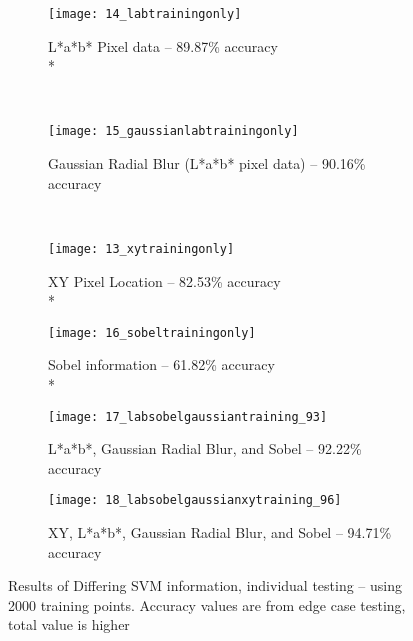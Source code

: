 \begin{figure}[h]
        \centering
        \begin{subfigure}[b]{0.3\textwidth}
                \centering
                \texttt{[image: 14\_labtrainingonly]}
                \caption{L*a*b* Pixel data -- 89.87\% accuracy \\*}
                \label{fig:14_labtrainingonly}
        \end{subfigure}%
        ~ %
        \begin{subfigure}[b]{0.3\textwidth}
                \centering

                \texttt{[image: 15\_gaussianlabtrainingonly]}
                \caption{Gaussian Radial Blur (L*a*b* pixel data) -- 90.16\% accuracy}
                \label{fig:15_gaussianlabtrainingonly}     
        \end{subfigure}
        ~ %
        \begin{subfigure}[b]{0.3\textwidth}
                \centering

                \texttt{[image: 13\_xytrainingonly]}
                \caption{XY Pixel Location -- 82.53\% accuracy \\*}
                \label{fig:13_xytrainingonly}
        \end{subfigure}
         \begin{subfigure}[b]{0.3\textwidth}
                \centering

                \texttt{[image: 16\_sobeltrainingonly]}
                \caption{Sobel information -- 61.82\% accuracy \\*}
                \label{fig:16_sobeltrainingonly}
        \end{subfigure}
        \begin{subfigure}[b]{0.3\textwidth}
                \centering

                \texttt{[image: 17\_labsobelgaussiantraining\_93]}
                \caption{L*a*b*, Gaussian Radial Blur, and Sobel -- 92.22\% accuracy}
                \label{fig:17_labsobelgaussiantraining_93}
        \end{subfigure}
        \begin{subfigure}[b]{0.3\textwidth}
                \centering

                \texttt{[image: 18\_labsobelgaussianxytraining\_96]}
                \caption{XY, L*a*b*, Gaussian Radial Blur, and Sobel -- 94.71\% accuracy}
                \label{fig:18_labsobelgaussianxytraining_96}
        \end{subfigure}

        \caption{Results of Differing SVM information, individual testing -- using 2000 training points. Accuracy values are from edge case testing, total value is higher}\label{fig:labResults}
\end{figure}
